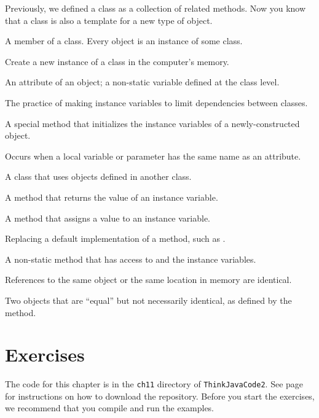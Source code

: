 \begin{description}

Previously, we defined a class as a collection of related methods.
Now you know that a class is also a template for a new type of object.

A member of a class.
Every object is an instance of some class.

Create a new instance of a class in the computer's memory.


An attribute of an object; a non-static variable defined at the class level.

The practice of making instance variables  to limit dependencies between classes.

A special method that initializes the instance variables of a newly-constructed object.

Occurs when a local variable or parameter has the same name as an attribute.

A class that uses objects defined in another class.

A method that returns the value of an instance variable.

A method that assigns a value to an instance variable.

Replacing a default implementation of a method, such as .

A non-static method that has access to  and the instance variables.

References to the same object or the same location in memory are identical.

Two objects that are ``equal'' but not necessarily identical, as defined by the  method.

\end{description}


\section{Exercises}

The code for this chapter is in the {\tt ch11} directory of {\tt ThinkJavaCode2}.
See page~\pageref{code} for instructions on how to download the repository.
Before you start the exercises, we recommend that you compile and run the examples.


